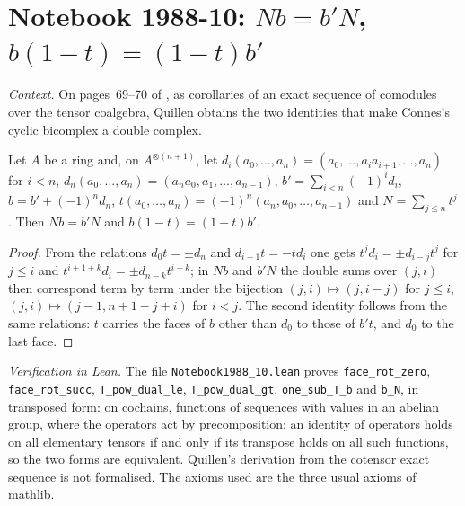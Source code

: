 \section[Notebook 1988-10: the identities of the cyclic bicomplex]{Notebook 1988-10: $Nb = b'N$, $b(1 - t) = (1 - t)b'$\protect{}}\label{sec:quillen-1988-10}

\emph{Context.} On pages~69--70 of , as corollaries of an exact sequence of comodules over the tensor coalgebra, Quillen obtains the two identities that make Connes's cyclic bicomplex a double complex.

\begin{encadre}
\begin{theoreme}\label{thm:quillen-1988-10}
Let $A$ be a ring and, on $A^{\otimes(n+1)}$, let $d_i(a_0, \dots, a_n) = (a_0, \dots, a_ia_{i+1}, \dots, a_n)$ for $i < n$, $d_n(a_0, \dots, a_n) = (a_na_0, a_1, \dots, a_{n-1})$, $b' = \sum_{i<n}(-1)^id_i$, $b = b' + (-1)^nd_n$, $t(a_0, \dots, a_n) = (-1)^n(a_n, a_0, \dots, a_{n-1})$ and $N = \sum_{j \le n}t^j$. Then $Nb = b'N$ and $b(1 - t) = (1 - t)b'$.
\end{theoreme}
\end{encadre}

\begin{proof}
From the relations $d_0t = \pm d_n$ and $d_{i+1}t = -td_i$ one gets $t^jd_i = \pm d_{i-j}t^j$ for $j \le i$ and $t^{i+1+k}d_i = \pm d_{n-k}t^{i+k}$; in $Nb$ and $b'N$ the double sums over $(j, i)$ then correspond term by term under the bijection $(j, i) \mapsto (j, i - j)$ for $j \le i$, $(j, i) \mapsto (j - 1, n + 1 - j + i)$ for $i < j$. The second identity follows from the same relations: $t$ carries the faces of $b$ other than $d_0$ to those of $b't$, and $d_0$ to the last face.
\end{proof}

\emph{Verification in Lean.} The file \href{\leanblobmain/Notebook1988_10.lean}{\texttt{Notebook1988\_10.\allowbreak{}lean}} proves \texttt{face\_rot\_zero}, \texttt{face\_rot\_succ}, \texttt{T\_pow\_dual\_le}, \texttt{T\_pow\_dual\_gt}, \texttt{one\_sub\_T\_b} and \texttt{b\_N}, in transposed form: on cochains, functions of sequences with values in an abelian group, where the operators act by precomposition; an identity of operators holds on all elementary tensors if and only if its transpose holds on all such functions, so the two forms are equivalent. Quillen's derivation from the cotensor exact sequence is not formalised. The axioms used are the three usual axioms of mathlib.

